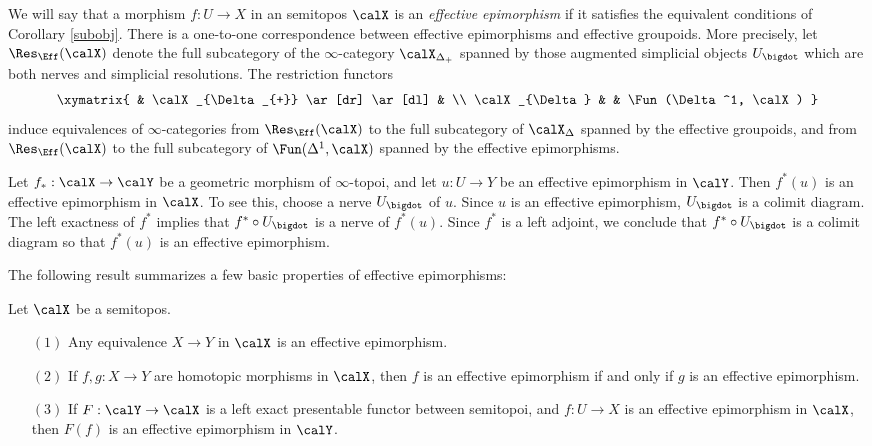 We will say that a morphism $f: U \rightarrow X$ in an semitopos $\calX$ is
an {\it effective epimorphism} if it satisfies the equivalent conditions of Corollary \ref{subobj}. There is a one-to-one correspondence between effective epimorphisms and effective groupoids. More precisely, let $\Res_{\Eff}(\calX)$ denote the full subcategory of the $\infty$-category
$\calX_{\Delta_{+}}$ spanned by those augmented simplicial objects $U_{\bigdot}$ which
are both \Cech nerves and simplicial resolutions. The restriction functors
$$ \xymatrix{ & \calX_{\Delta_{+}} \ar[dr] \ar[dl] & \\
\calX_{\Delta} & & \Fun(\Delta^1, \calX) }$$
induce equivalences of $\infty$-categories from $\Res_{\Eff}(\calX)$ to the full subcategory
of $\calX_{\Delta}$ spanned by the effective groupoids, and from $\Res_{\Eff}(\calX)$ to the full subcategory of $\Fun(\Delta^1, \calX)$ spanned by the effective epimorphisms.

\begin{remark}\label{geoeff}
Let $f_{\ast}: \calX \rightarrow \calY$ be a geometric morphism of $\infty$-topoi, and let
$u: U \rightarrow Y$ be an effective epimorphism in $\calY$. Then $f^{\ast}(u)$ is an effective epimorphism in $\calX$. To see this, choose a \Cech nerve $U_{\bigdot}$ of $u$. Since
$u$ is an effective epimorphism, $U_{\bigdot}$ is a colimit diagram. The left exactness of $f^{\ast}$ implies that $f^{\ast} \circ U_{\bigdot}$ is a \Cech nerve of $f^{\ast}(u)$. Since $f^{\ast}$ is a left adjoint, we conclude that $f^{\ast} \circ U_{\bigdot}$ is a colimit diagram so that $f^{\ast}(u)$ is an effective epimorphism.
\end{remark}

The following result summarizes a few basic properties of effective epimorphisms:

\begin{proposition}\label{sinn}
Let $\calX$ be a semitopos.

\begin{itemize}
\item[$(1)$] Any equivalence $X \rightarrow Y$ in $\calX$ is an effective epimorphism.

\item[$(2)$] If $f,g: X \rightarrow Y$ are homotopic morphisms in $\calX$, then
$f$ is an effective epimorphism if and only if $g$ is an effective epimorphism.

\item[$(3)$] If $F: \calY \rightarrow \calX$ is a left exact presentable functor between semitopoi, and $f: U \rightarrow X$ is an effective epimorphism in $\calX$, then $F(f)$ is an effective epimorphism
in $\calY$.
\end{itemize}
\end{proposition}


